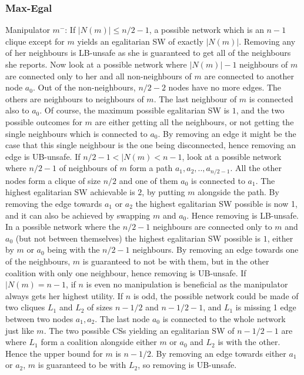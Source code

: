 \subsubsection*{Max-Egal}
Manipulator $m^-$:
If $|N(m)| \leq n/2 -1$, a possible network which is an $n-1$ clique except for $m$ yields an egalitarian SW of exactly $|N(m)|$. Removing any of her neighbours is LB-unsafe as she is guaranteed to get all of the neighbours she reports.
Now look at a possible network where $|N(m)|-1$ neighbours of $m$ are connected only to her and all non-neighbours of $m$ are connected to another node $a_0$. Out of the non-neighbours, $n/2 -2 $ nodes have no more edges. The others are neighbours to neighbours of $m$. The last neighbour of $m$ is connected also to $a_0$. Of course, the maximum possible egalitarian SW is $1$, and the two possible outcomes for $m$ are either getting all the neighbours, or not getting the single neighbours which is connected to $a_0$. By removing an edge it might be the case that this single neighbour is the one being disconnected, hence removing an edge is UB-unsafe.
If $n/2 -1 < |N(m) < n-1$, look at a possible network where $n/2-1$ of neighbours of $m$ form a path $a_1, a_2, .. ,a_{n/2-1}$. All the other nodes form a clique of size $n/2$ and one of them $a_0$ is connected to $a_1$. The highest egalitarian SW achievable is $2$, by putting $m$ alongside the path. By removing the edge towards $a_1$ or $a_2$ the highest egalitarian SW possible is now 1, and it can also be achieved by swapping $m$ and $a_0$. Hence removing is LB-unsafe.
In a possible network where the $n/2-1$ neighbours are connected only to $m$ and $a_0$ (but not between themselves) the highest egalitarian SW possible is $1$, either by $m$ or $a_0$ being with the $n/2-1$ neighbours. By removing an edge towards one of the neighbours, $m$ is guaranteed to not be with them, but in the other coalition with only one neighbour, hence removing is UB-unsafe.
If $|N(m)=n-1$, if $n$ is even no manipulation is beneficial as the manipulator always gets her highest utility. 
If $n$ is odd, the possible network could be made of two cliques $L_1$ and $L_2$ of sizes $n-1/2$ and $n-1/2 -1$, and $L_1$ is missing 1 edge between two nodes $a_1, a_2$. The last node $a_0$ is connected to the whole network just like $m$. The two possible CSs yielding an egalitarian SW of $n-1/2 -1$ are where $L_1$ form a coalition alongside either $m$ or $a_0$ and $L_2$ is with the other. Hence the upper bound for $m$ is $n-1/2$. By removing an edge towards either $a_1$ or $a_2$, $m$ is guaranteed to be with $L_2$, so removing is UB-unsafe.

